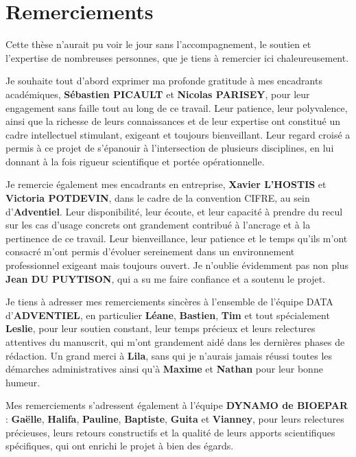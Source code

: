 \chapter*{Remerciements}

Cette thèse n’aurait pu voir le jour sans l’accompagnement, le soutien et l’expertise de nombreuses personnes, que je tiens à remercier ici chaleureusement. \vspace{0.5\baselineskip}

Je souhaite tout d’abord exprimer ma profonde gratitude à mes encadrants académiques, \textbf{Sébastien PICAULT} et \textbf{Nicolas PARISEY}, pour leur engagement sans faille tout au long de ce travail. Leur patience, leur polyvalence, ainsi que la richesse de leurs connaissances et de leur expertise ont constitué un cadre intellectuel stimulant, exigeant et toujours bienveillant. Leur regard croisé a permis à ce projet de s’épanouir à l’intersection de plusieurs disciplines, en lui donnant à la fois rigueur scientifique et portée opérationnelle. \vspace{0.5\baselineskip}

Je remercie également mes encadrants en entreprise, \textbf{Xavier L'HOSTIS} et \textbf{Victoria POTDEVIN}, dans le cadre de la convention CIFRE, au sein d’\textbf{Adventiel}. Leur disponibilité, leur écoute, et leur capacité à prendre du recul sur les cas d’usage concrets ont grandement contribué à l’ancrage et à la pertinence de ce travail. Leur bienveillance, leur patience et le temps qu’ils m’ont consacré m’ont permis d’évoluer sereinement dans un environnement professionnel exigeant mais toujours ouvert. Je n'oublie évidemment pas non plus \textbf{Jean DU PUYTISON}, qui a su me faire confiance et a soutenu le projet.\vspace{0.5\baselineskip}

Je tiens à adresser mes remerciements sincères à l’ensemble de l’équipe DATA  d’\textbf{ADVENTIEL}, en particulier \textbf{Léane}, \textbf{Bastien}, \textbf{Tim} et tout spécialement \textbf{Leslie}, pour leur soutien constant, leur temps précieux et leurs relectures attentives du manuscrit, qui m’ont grandement aidé dans les dernières phases de rédaction. Un grand merci à \textbf{Lila}, sans qui je n'aurais jamais réussi toutes les démarches administratives ainsi qu'à \textbf{Maxime} et \textbf{Nathan} pour leur bonne humeur. \vspace{0.5\baselineskip}

Mes remerciements s’adressent également à l’équipe \textbf{DYNAMO de BIOEPAR} : \textbf{Gaëlle}, \textbf{Halifa}, \textbf{Pauline}, \textbf{Baptiste}, \textbf{Guita} et \textbf{Vianney}, pour leurs relectures précieuses, leurs retours constructifs et la qualité de leurs apports scientifiques spécifiques, qui ont enrichi le projet à bien des égards. \vspace{0.5\baselineskip}

